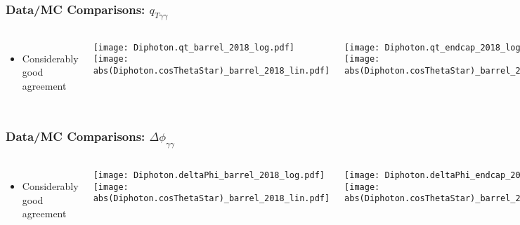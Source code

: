 \documentclass{beamer}
\newcommand\Wider[2][3em]{%
\makebox[\linewidth][c]{%
  \begin{minipage}{\dimexpr\textwidth+#1\relax}
  \raggedright#2
  \end{minipage}%
  }%
}
\begin{document}
\begin{frame}[t]
\frametitle{Data/MC Comparisons: $q_{T\gamma\gamma}$}
\begin{columns}[T]
  \begin{itemize}
    \item {\footnotesize \raggedleft Considerably good agreement}
  \end{itemize}

\Wider[2.9em]{
\raggedleft
\rotatebox{90}{\parbox{4cm}{\raggedleft \small{\textcolor{blue}{Full 2018 dataset}}}}\\
}
\Wider[3.4em]{
\raggedleft
\rotatebox{90}{\parbox{4cm}{\raggedleft \small{\textcolor{blue}{New 2018 data}}}}
}

\texttt{[image: Diphoton.qt\_barrel\_2018\_log.pdf]}
\texttt{[image: abs(Diphoton.cosThetaStar)\_barrel\_2018\_lin.pdf]}
\caption{\textcolor{white}{ta-} \textcolor{blue}{\small {Barrel-Barrel}}}

\texttt{[image: Diphoton.qt\_endcap\_2018\_log.pdf]}
\texttt{[image: abs(Diphoton.cosThetaStar)\_barrel\_2018\_lin.pdf]}
\caption{\textcolor{white}{ta-} \textcolor{blue}{\small {Barrel-Endcap}}}
\end{columns}
\end{frame}

\begin{frame}[t]
\frametitle{Data/MC Comparisons: $\Delta\phi_{\gamma\gamma}$}
\begin{columns}[T]
  \begin{itemize}
    \item {\footnotesize \raggedleft Considerably good agreement}
  \end{itemize}

\Wider[2.9em]{
\raggedleft
\rotatebox{90}{\parbox{4cm}{\raggedleft \small{\textcolor{blue}{Full 2018 dataset}}}}\\
}
\Wider[3.4em]{
\raggedleft
\rotatebox{90}{\parbox{4cm}{\raggedleft \small{\textcolor{blue}{New 2018 data}}}}
}

\texttt{[image: Diphoton.deltaPhi\_barrel\_2018\_log.pdf]}
\texttt{[image: abs(Diphoton.cosThetaStar)\_barrel\_2018\_lin.pdf]}
\caption{\textcolor{white}{ta-} \textcolor{blue}{\small {Barrel-Barrel}}}

\texttt{[image: Diphoton.deltaPhi\_endcap\_2018\_log.pdf]}
\texttt{[image: abs(Diphoton.cosThetaStar)\_barrel\_2018\_lin.pdf]}
\caption{\textcolor{white}{ta-} \textcolor{blue}{\small {Barrel-Endcap}}}
\end{columns}
\end{frame}
\end{document}
